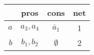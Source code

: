 \documentclass[preview, border={0pt 5pt 0pt 1pt}]{standalone} %
\begin{document}



    \begin{table}
        \begin{tabular}{rccc}
            \toprule
                  & pros & cons & net \\
            \midrule
            \(a\) & \(a_3, a_4\) & \(\overline{a}_1\) & 1 \\
            \(b\) & \(b_1,b_2\) & \(\emptyset\) & 2 \\
            \bottomrule
        \end{tabular}
    \end{table}

\end{document}
